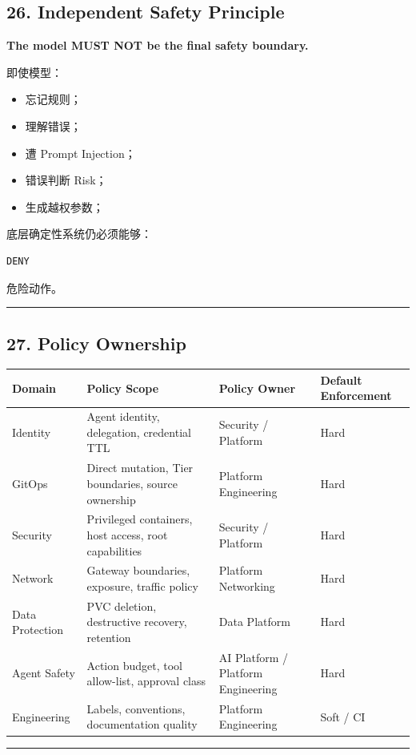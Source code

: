 \documentclass[11pt,a4paper]{article}
\begin{document}
\subsection{26. Independent Safety Principle}
\begin{gfmBlockquote}
\textbf{The model MUST NOT be the final safety boundary.}
\end{gfmBlockquote}
即使模型：

\begin{itemize}
  \item 忘记规则；
  \item 理解错误；
  \item 遭 Prompt Injection；
  \item 错误判断 Risk；
  \item 生成越权参数；
\end{itemize}
底层确定性系统仍必须能够：

\begin{lstlisting}[language=text]
DENY
\end{lstlisting}
危险动作。

\vspace{0.5em}\hrule\vspace{0.5em}
\subsection{27. Policy Ownership}
\begin{table}[htbp]
\centering
\small
\begin{tabularx}{\textwidth}{| X | X | X | X |}
\hline
\rowcolor{codebg}
\textbf{Domain} & \textbf{Policy Scope} & \textbf{Policy Owner} & \textbf{Default Enforcement} \\ \hline
Identity & Agent identity, delegation, credential TTL & Security / Platform & Hard \\ \hline
\rowcolor{codebg!50} GitOps & Direct mutation, Tier boundaries, source ownership & Platform Engineering & Hard \\ \hline
Security & Privileged containers, host access, root capabilities & Security / Platform & Hard \\ \hline
\rowcolor{codebg!50} Network & Gateway boundaries, exposure, traffic policy & Platform Networking & Hard \\ \hline
Data Protection & PVC deletion, destructive recovery, retention & Data Platform & Hard \\ \hline
\rowcolor{codebg!50} Agent Safety & Action budget, tool allow-list, approval class & AI Platform / Platform Engineering & Hard \\ \hline
Engineering & Labels, conventions, documentation quality & Platform Engineering & Soft / CI \\ \hline
\end{tabularx}
\end{table}
\vspace{0.5em}\hrule\vspace{0.5em}
\end{document}
